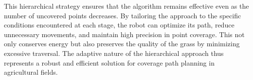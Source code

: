 \vspace*{6mm}   


This hierarchical strategy ensures that the algorithm remains effective even as the number of uncovered points decreases. By tailoring the approach to the specific conditions encountered at each stage, the robot can optimize its path, reduce unnecessary movements, and maintain high precision in point coverage. This not only conserves energy but also preserves the quality of the grass by minimizing excessive traversal. The adaptive nature of the hierarchical approach thus represents a robust and efficient solution for coverage path planning in agricultural fields.

\vspace*{6mm}  

